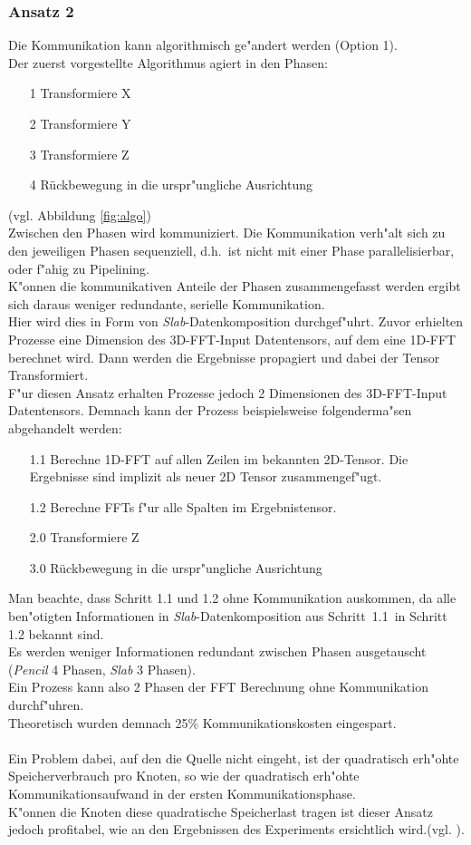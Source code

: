 \subsubsection{Ansatz 2}
Die Kommunikation kann algorithmisch ge"andert werden (Option 1).\\
Der zuerst vorgestellte Algorithmus agiert in den Phasen:
\begin{itemize}
	\item[1] Transformiere X
	\item[2] Transformiere Y
	\item[3] Transformiere Z
	\item[4] Rückbewegung in die urspr"ungliche Ausrichtung
\end{itemize}
(vgl. Abbildung \ref{fig:algo})\\
Zwischen den Phasen wird kommuniziert. Die Kommunikation verh"alt sich zu den jeweiligen Phasen sequenziell, d.h.~ist nicht mit einer Phase parallelisierbar, oder f"ahig zu Pipelining.\\
K"onnen die kommunikativen Anteile der Phasen zusammengefasst werden ergibt sich daraus weniger redundante, serielle Kommunikation.\\
Hier wird dies in Form von \textit{Slab}-Datenkomposition durchgef"uhrt.
Zuvor erhielten Prozesse eine Dimension des 3D-FFT-Input Datentensors, auf dem eine 1D-FFT berechnet wird. Dann werden die Ergebnisse propagiert und dabei der Tensor Transformiert.\\
F"ur diesen Ansatz erhalten Prozesse jedoch 2 Dimensionen des 3D-FFT-Input Datentensors. Demnach kann der Prozess beispielsweise folgenderma"sen abgehandelt werden:
\begin{itemize}
	\item[1.1] Berechne 1D-FFT auf allen Zeilen im bekannten 2D-Tensor. Die Ergebnisse sind implizit als neuer 2D Tensor zusammengef"ugt.
	\item[1.2] Berechne FFTs f"ur alle Spalten im Ergebnistensor.
	\item[2.0] Transformiere Z
	\item[3.0] Rückbewegung in die urspr"ungliche Ausrichtung
\end{itemize}
Man beachte, dass Schritt 1.1 und 1.2 ohne Kommunikation auskommen, da alle ben"otigten Informationen in \textit{Slab}-Datenkomposition aus Schritt~1.1~in Schritt 1.2 bekannt sind.\\
Es werden weniger Informationen redundant zwischen Phasen ausgetauscht (\textit{Pencil} 4 Phasen, \textit{Slab} 3 Phasen).\\
Ein Prozess kann also 2 Phasen der FFT Berechnung ohne Kommunikation durchf"uhren.\\
Theoretisch wurden demnach 25\% Kommunikationskosten eingespart.\\
\\
Ein Problem dabei, auf den die Quelle \cite{mainpaper} nicht eingeht, ist der quadratisch erh"ohte Speicherverbrauch pro Knoten, so wie der quadratisch erh"ohte Kommunikationsaufwand in der ersten Kommunikationsphase.\\
K"onnen die Knoten diese quadratische Speicherlast tragen ist dieser Ansatz jedoch profitabel, wie an den Ergebnissen des Experiments ersichtlich wird.(vgl. \cite[Abb. 6]{mainpaper}).

